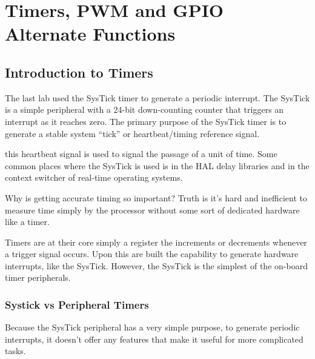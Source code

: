 \documentclass[11pt,fleqn]{book} %
\begin{document}
	
\chapter{Timers, PWM and GPIO Alternate Functions}

\section{Introduction to Timers}
The last lab used the SysTick timer to generate a periodic interrupt. The SysTick is a simple peripheral with a 24-bit down-counting counter that triggers an interrupt as it reaches zero. The primary purpose of the SysTick timer is to generate a stable system ``tick'' or heartbeat/timing reference signal. 

this heartbeat signal is used to signal the passage of a unit of time. Some common places where the SysTick is used is in the HAL delay libraries and in the context switcher of real-time operating systems. 

Why is getting accurate timing so important? Truth is it's hard and inefficient to measure time simply by the processor without some sort of dedicated hardware like a timer. 

Timers are at their core simply a register the increments or decrements whenever a trigger signal occurs. Upon this are built the capability to generate hardware interrupts, like the SysTick. However, the SysTick is the simplest of the on-board timer peripherals.

    
    \subsection{Systick vs Peripheral Timers}
     Because the SysTick peripheral has a very simple purpose, to generate periodic interrupts, it doesn't offer any features that make it useful for more complicated tasks. 
     
\end{document}
